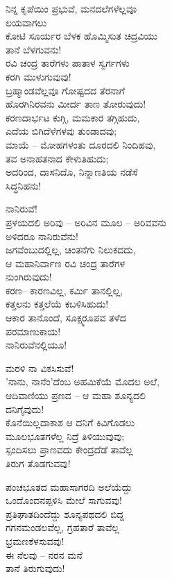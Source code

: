 ನಿನ್ನ ಕೃಪೆಯಿಂ ಪ್ರಭುವೆ, ಮನದಲೆಗಳೆಲ್ಲವೂ\\ಲಯವಾಗಲು\\ಕೋಟಿ ಸೂರ್ಯರ ಬೆಳಕ ಹೊಮ್ಮಿಸುತ ಚಿದ್ರವಿಯು\\ತಾನೆ ಬೆಳಗುವನು!\\ರವಿ ಚಂದ್ರ ತಾರೆಗಳು ಪಾತಾಳ ಸ್ವರ್ಗಗಳು\\ಕರಗಿ ಮುಳುಗುವುವು!\\ಬ್ರಹ್ಮಾಂಡವೆಲ್ಲವೂ ಗೋಷ್ಟದದ ತೆರನಾಗೆ\\ಹೊರಗಿನಿರವನು ಮೀರ್ದ ತಾಣ ತೋರುವುದು!\\
 ಕರಣದಾರ್ಭಟ ಕುಗ್ಗಿ, ಮಮಕಾರ ತಗ್ಗಿಹುದು,\\ಎದೆಯ ಬಿಗಿದೆಳೆಗಳವು ತುಂಡಾದವು;\\ಮಾಯೆ – ಮೋಹಗಳಂತು ದೂರದಲಿ ನಿಂದಿಹವು,\\ತವ ಅನಾಹತನಾದ ಕೇಳುತಿಹುದು;\\ಅದರಿಂದ, ದಾಸನಿದೊ, ನಿನ್ನಾಣತಿಯ ನಡೆಸೆ\\ಸಿದ್ಧನಿಹನು!

ನಾನಿರುವೆ!\\ಪ್ರಳಯದಲಿ ಅರಿವು – ಅರಿವಿನ ಮೂಲ – ಅರಿವವನು\\ಅಳಿದರೂ ನಾನಿರುವೆನು!\\ಜಗವೆಂಬುದಲ್ಲಿಲ್ಲ, ಚಿಂತನೆಗು ನಿಲುಕದದು,\\ಆ ಮಹಾನಿರ್ವಾಣ ರವಿ ಚಂದ್ರ ತಾರೆಗಳ\\ನುಂಗಿರುವುದು!\\ಕರಣ– ಕಾರಣವಿಲ್ಲ, ಕರ್ಮಿ ತಾನಲ್ಲಿಲ್ಲ,\\ಕತ್ತಲನು ಕತ್ತಲೆಯೆ ಕಬಳಿಸಿಹುದು!\\ಆಕಾರ ತಾನೊಂದೆ, ಸೂಕ್ಷ್ಮರೂಪವ ತಳೆದ\\ಪರಮಾಣುಕಾಯ!\\ನಾನಿರುವೆನಲ್ಲಿಯೂ!

ಮರಳಿ ನಾ ವಿಕಸಿಸುವೆ!\\'ನಾನು, ನಾನೆಂ'ದೆಂಬ ಅಹಮಿಕೆಯೆ ಮೊದಲ ಅಲೆ,\\ಆದಿವಾಣಿಯು ಪ್ರಣವ – ಆ ಮಹಾ ಶೂನ್ಯದಲಿ\\ದನಿಗೈವುದು!\\ಕೊನೆಯಿಲ್ಲದಾಕಾಶ ಆ ದನಿಗೆ ಕಿವಿಗೊಡಲು\\ಮೂಲಭೂತಗಳೆಲ್ಲ ನಿದ್ರೆ ತಿಳಿಯುವುವು;\\ಸ್ಪಂದಿಸಲು ಪ್ರಾಣವದು ಕೇಂದ್ರದೆಡೆ ತಾವೆಲ್ಲ\\ತಿರುಗ ತೊಡಗುವವು!

ಪಂಚಭೂತದ ಮಹಾಸಾಗರದಿ ಅಲೆಯೆದ್ದು\\ಒಂದೊಂದನಪ್ಪಳಿಸಿ ಮೇಲೆ ಸಾಗುವವು!\\ಪ್ರತಿಘಾತದಿಂದೆದ್ದು ಶೂನ್ಯಪಥದಲಿ ಬಿದ್ದ\\ಗಗನಮಂಡಲವೆಲ್ಲ, ಗ್ರಹತಾರೆ ತಾವೆಲ್ಲ\\ಭ್ರಮಣಕೆಳಸುವವು!\\ಈ ನೆಲವು – ನರನ ಮನೆ\\ತಾನೆ ತಿರುಗುವುದು!

